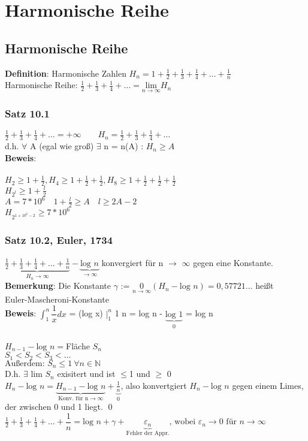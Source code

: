 \chapter{Harmonische Reihe}
\section{Harmonische Reihe}
\newcommand{\harmonisch}{\frac{1}{2}+\frac{1}{3}+\frac{1}{4}+\dots}
\textbf{Definition}: Harmonische Zahlen $H_n = 1 + \frac{1}{2}+\frac{1}{3}+\frac{1}{4}+\dots+\frac{1}{n}$\smallskip\\
Harmonische Reihe: $\frac{1}{2}+\frac{1}{3}+\frac{1}{4}+\dots = \underset{n\rightarrow\infty}{\text{lim} }H_n$\medskip\\
\subsection{Satz 10.1}
$\harmonisch = + \infty \qquad H_n = \harmonisch$\medskip\\
d.h. $\forall$ A (egal wie groß) $\exists$ n = n(A) : $H_n \geq A$\smallskip\\
\textbf{Beweis}:\\
\\
$H_2 \geq 1 + \frac{1}{2}, H_4 \geq 1+\frac{1}{2}+\frac{1}{2}, H_8 \geq 1+\frac{1}{2}+\frac{1}{2}+\frac{1}{2}$\\
$H_{2^l}\geq 1+\frac{l}{2}$\smallskip\\
$A=7*10^6 \quad 1+\frac{l}{2} \geq A\quad l \geq 2A-2$\\
$H_{2^{1+10^6-2}} \geq 7 * 10^6$
\subsection{Satz 10.2, Euler, 1734}
$\underbrace{\harmonisch+\frac{1}{n}}_{H_n\rightarrow\infty}-\underbrace{\text{log }n}_{\rightarrow\infty} $ konvergiert für n $\rightarrow$ $\infty$ gegen eine Konstante.\medskip\\
\textbf{Bemerkung}: Die Konstante $ \gamma $ := $\underset{n\rightarrow\infty}{\text{0}}(H_n-\text{log } n) = 0,57721\dots $ heißt\\
Euler-Mascheroni-Konstante\smallskip\\
\textbf{Beweis}: $\int_1^n \dfrac{1}{x} dx$ = (log x) $  \big|_1^n$ 1 n = log n - $\underbrace{\text{log 1}}_{0}$ = log n\smallskip\\
\\
$H_{n-1}  - \text{log } n = $Fläche $S_n$\\
$S_1<S_2<S_3<\dots \qquad$\\$ \text{Außerdem: }S_n \leq 1\: \forall n \in \mathds{N}$
\\
D.h. $\exists$ lim $S_n$ exisitert und ist $\leq$1 und $\geq$ 0\medskip\\
$H_n - \text{log }n = \underbrace{H_{n-1}-\text{log }n}_{\text{Konv. für n}\rightarrow\infty} + \underbrace{\frac{1}{n}}_0$, also konvertgiert $H_n - \text{log }n$ gegen einem Limes, der zwischen 0 und 1 liegt. \qed\medskip\\
$\harmonisch+\dfrac{1}{n} = \text{log }n + \gamma + \underbrace{\varepsilon_n}_\text{Fehler der Appr.}\text{, wobei }\varepsilon_n \rightarrow 0 \text{ für } n\rightarrow\infty$
